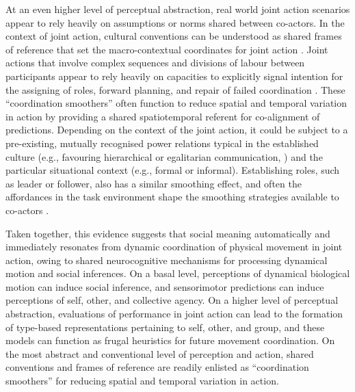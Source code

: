 \begin{CJK}{UTF8}{gbsn}
At an even higher level of perceptual abstraction, real world joint action scenarios appear to rely heavily on assumptions or norms shared between co-actors.  In the context of joint action, cultural conventions can be understood as shared frames of reference that set the macro-contextual coordinates for joint action \citep{Clark2013}. Joint actions that involve complex sequences and divisions of labour between participants appear to rely heavily on capacities to explicitly signal intention for the assigning of roles, forward planning, and repair of failed coordination \citep{Frith2010}.  These ``coordination smoothers'' \citep{Vesper2017} often function to reduce spatial and temporal variation in action by providing a shared spatiotemporal referent for co-alignment of predictions.  Depending on the context of the joint action, it could be subject to a pre-existing, mutually recognised power relations typical in the established culture (e.g., favouring hierarchical or egalitarian communication, \citep[see]{Cheon2011}) and the particular situational context (e.g., formal or informal).  Establishing roles, such as leader or follower, also has a similar smoothing effect, and often the affordances in the task environment shape the smoothing strategies available to co-actors \citep{Marsh2009}.

Taken together, this evidence suggests that social meaning automatically and immediately resonates from dynamic coordination of physical movement in joint action, owing to shared neurocognitive mechanisms for processing dynamical motion and social inferences.  On a basal level, perceptions of dynamical biological motion can induce social inference, and sensorimotor predictions can induce perceptions of self, other, and collective agency.  On a higher level of perceptual abstraction, evaluations of performance in joint action can lead to the formation of type-based representations pertaining to self, other, and group, and these models can function as frugal heuristics for future movement coordination.  On the most abstract and conventional level of perception and action, shared conventions and frames of reference are readily enlisted as ``coordination smoothers'' for reducing spatial and temporal variation in action.



\end{CJK}
